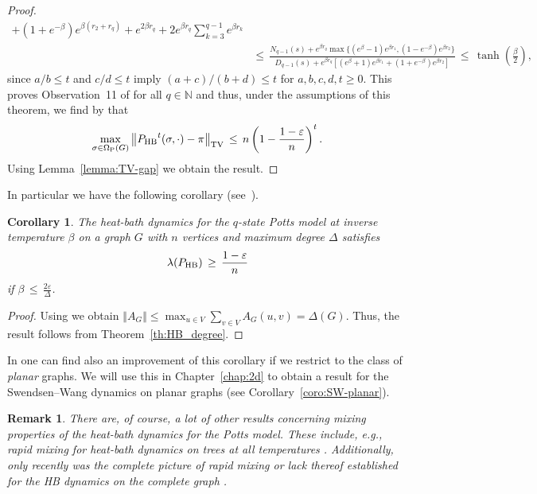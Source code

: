 \documentclass{dis}
\newtheorem{corollary}[theorem]{Corollary}
\newtheorem{remark}[theorem]{Remark}
\theoremstyle{citing}
\begin{document}
\begin{proof}
\[\begin{split}
{		+\left(1+e^{-\beta}\right) e^{\beta (r_2+r_q)} 
		+ e^{2\beta r_q} + 2e^{\beta r_q}
			\sum_{k=3}^{q-1} e^{\beta r_k}}\\
\,&\le\, \frac{N_{q-1}(s) + e^{\beta r_q} 
		\max\bigl\{(e^\beta-1) e^{\beta r_1}, 
		(1-e^{-\beta})	e^{\beta r_2}\bigr\}}
	{D_{q-1}(s) + e^{\beta r_q} [\left(e^{\beta}+1\right) e^{\beta r_1}
		+\left(1+e^{-\beta}\right) e^{\beta r_2}]} 
\,\le\, \tanh\left(\frac{\beta}{2}\right),
\end{split}\]
since $a/b\le t$ and $c/d\le t$ imply $(a+c)/(b+d)\le t$ for 
$a,b,c,d,t\ge0$. This proves Observation~11 of \cite{Ha} 
for all $q\in{\ensuremath{\mathbb{N}}}$ and thus, under the assumptions of this theorem, 
we find by \cite[Thm.~6]{Ha} that
\[
\max_{\sigma\in{{\Omega}_{\rm P}}(G)}{\left\Vert {{P_{\rm HB}}^t(\sigma,\cdot)-\pi} \right\Vert_{\rm TV}} 
\,\le\, n\left(1-\frac{1-{\varepsilon}}{n}\right)^t.
\]
Using Lemma~\ref{lemma:TV-gap} we obtain the result. 
\end{proof}

\vspace{3mm}

In particular we have the following corollary (see~\cite{Ha}).

\begin{corollary}\label{coro:P-HB_degree}
The heat-bath dynamics for the $q$-state Potts model  
at inverse temperature $\beta$
on a graph $G$ with $n$ vertices and maximum degree ${\Delta}$
satisfies
\[
\lambda({P_{\rm HB}}) \,\ge\, \frac{1-{\varepsilon}}{n}
\]
if $\beta\,\le\,\frac{2{\varepsilon}}{\Delta}$.
\end{corollary}

\begin{proof}
Using \cite[Thm.~8.1.22]{HJ-matrix} we obtain
${\left\Vert {A_G} \right\Vert} \le \max_{u\in V} \sum_{v\in V} A_G(u,v) = {\Delta}(G)$.
Thus, the result follows from Theorem~\ref{th:HB_degree}.
\end{proof}

In \cite{Ha} one can find also an improvement of this 
corollary if we restrict to the class of \emph{planar} graphs. 
We will use this in Chapter~\ref{chap:2d} to obtain a result 
for the Swendsen--Wang dynamics on planar graphs (see 
Corollary~\ref{coro:SW-planar}).

\begin{remark}
There are, of course, a lot of other results concerning 
mixing properties of the heat-bath dynamics for the Potts model. 
These include, e.g., rapid mixing for heat-bath dynamics on trees 
at all temperatures \cite{BKMP}. 
Additionally, only recently was the complete picture of rapid mixing 
or lack thereof established for the HB dynamics on the 
\emph{complete graph} \cite{CDLLPS,LLP}.
\end{remark}
\end{document}
